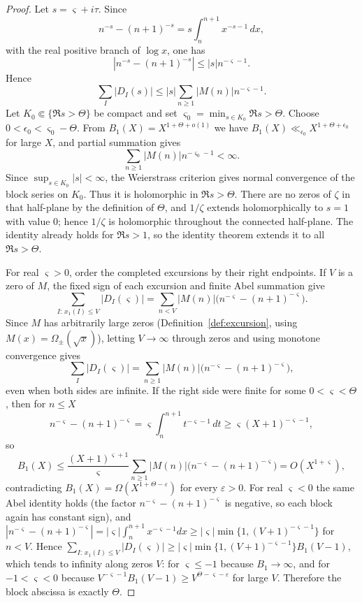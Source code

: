 \documentclass[11pt]{amsart}
\numberwithin{equation}{section}
\theoremstyle{plain}
\theoremstyle{definition}
\theoremstyle{remark}
\newcommand{\eps}{\varepsilon}
\begin{document}
\begin{proof}
Let $s=\varsigma+i\tau$.  Since
\[
 n^{-s}-(n+1)^{-s}
 =s\int_n^{n+1}x^{-s-1}\,dx,
\]
with the real positive branch of $\log x$, one has
\[
 |n^{-s}-(n+1)^{-s}|\le |s|n^{-\varsigma-1}.
\]
Hence
\[
 \sum_I|D_I(s)|
 \le |s|\sum_{n\ge1}|M(n)|n^{-\varsigma-1}.
\]
Let $K_0\Subset\{\Re s>\Theta\}$ be compact and set
$\varsigma_0=\min_{s\in K_0}\Re s>\Theta$.  Choose
$0<\epsilon_0<\varsigma_0-\Theta$.  From
$B_1(X)=X^{1+\Theta+o(1)}$ we have
$B_1(X)\ll_{\epsilon_0}X^{1+\Theta+\epsilon_0}$ for large $X$, and partial
summation gives
\[
 \sum_{n\ge1}|M(n)|n^{-\varsigma_0-1}<\infty.
\]
Since $\sup_{s\in K_0}|s|<\infty$, the Weierstrass criterion gives normal
convergence of the block series on $K_0$.  Thus it is holomorphic in
$\Re s>\Theta$.  There are no zeros of $\zeta$ in that half-plane by the
definition of $\Theta$, and $1/\zeta$ extends holomorphically to $s=1$ with
value $0$; hence $1/\zeta$ is holomorphic throughout the connected
half-plane.  The identity already holds for $\Re s>1$, so the
identity theorem extends it to all $\Re s>\Theta$.

For real $\varsigma>0$, order the completed excursions by their right
endpoints.  If $V$ is a zero of $M$, the fixed sign of each excursion and
finite Abel summation give
\[
 \sum_{I:\,x_1(I)\le V}|D_I(\varsigma)|
 =\sum_{n<V}|M(n)|
 \bigl(n^{-\varsigma}-(n+1)^{-\varsigma}\bigr).
\]
Since $M$ has arbitrarily large zeros (Definition~\ref{def:excursion},
using $M(x)=\Omega_\pm(\sqrt x)$), letting $V\to\infty$ through zeros and
using monotone convergence gives
\begin{equation}
\label{eq:block-absolute-real-axis}
 \sum_I|D_I(\varsigma)|
 =\sum_{n\ge1}|M(n)|
 \bigl(n^{-\varsigma}-(n+1)^{-\varsigma}\bigr),
\end{equation}
even when both sides are infinite.
If the right side were finite for some $0<\varsigma<\Theta$, then for
$n\le X$
\[
 n^{-\varsigma}-(n+1)^{-\varsigma}
 =\varsigma\int_n^{n+1}t^{-\varsigma-1}\,dt
 \ge \varsigma(X+1)^{-\varsigma-1},
\]
so
\[
 B_1(X)\le
 \frac{(X+1)^{\varsigma+1}}{\varsigma}
 \sum_{n\ge1}|M(n)|
 \bigl(n^{-\varsigma}-(n+1)^{-\varsigma}\bigr)
 =O(X^{1+\varsigma}),
\]
contradicting $B_1(X)=\Omega(X^{1+\Theta-\eps})$ for every $\eps>0$.
For real $\varsigma<0$ the same Abel identity holds (the factor
$n^{-\varsigma}-(n+1)^{-\varsigma}$ is negative, so each block again has
constant sign), and
$|n^{-\varsigma}-(n+1)^{-\varsigma}|=|\varsigma|\int_n^{n+1}x^{-\varsigma-1}dx
\ge|\varsigma|\min\{1,(V+1)^{-\varsigma-1}\}$ for $n<V$. Hence
$\sum_{I:\,x_1(I)\le V}|D_I(\varsigma)|\ge|\varsigma|\min\{1,(V+1)^{-\varsigma-1}\}
B_1(V-1)$, which tends to infinity along zeros $V$: for $\varsigma\le-1$ because
$B_1\to\infty$, and for $-1<\varsigma<0$ because
$V^{-\varsigma-1}B_1(V-1)\ge V^{\Theta-\varsigma-\eps}$ for large $V$.  Therefore the block abscissa is
exactly $\Theta$.
\end{proof}
\end{document}
